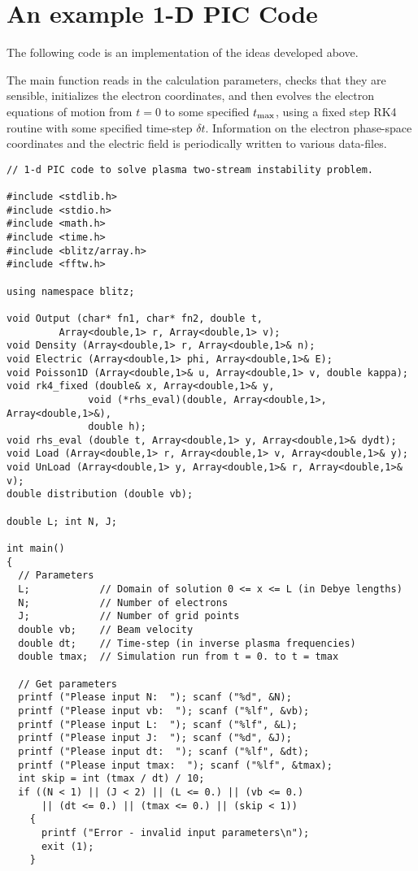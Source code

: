 \section{An example 1-D PIC Code}
The following code  is an implementation of the ideas developed above.

The main function  reads in the calculation parameters, checks that they
are sensible, initializes the electron coordinates, and then evolves the
electron equations of motion from $t=0$ to some specified $t_{\rm max}$,
using a fixed step RK4 routine with some specified time-step $\delta t$.
Information on the electron phase-space coordinates and the electric field is periodically written
to various data-files.
\begin{verbatim}
// 1-d PIC code to solve plasma two-stream instability problem.

#include <stdlib.h>
#include <stdio.h>
#include <math.h>
#include <time.h>
#include <blitz/array.h>
#include <fftw.h>

using namespace blitz;

void Output (char* fn1, char* fn2, double t, 
	     Array<double,1> r, Array<double,1> v);
void Density (Array<double,1> r, Array<double,1>& n);
void Electric (Array<double,1> phi, Array<double,1>& E);
void Poisson1D (Array<double,1>& u, Array<double,1> v, double kappa);
void rk4_fixed (double& x, Array<double,1>& y, 
              void (*rhs_eval)(double, Array<double,1>, Array<double,1>&), 
              double h);
void rhs_eval (double t, Array<double,1> y, Array<double,1>& dydt);
void Load (Array<double,1> r, Array<double,1> v, Array<double,1>& y);
void UnLoad (Array<double,1> y, Array<double,1>& r, Array<double,1>& v);
double distribution (double vb);

double L; int N, J;

int main()
{
  // Parameters
  L;            // Domain of solution 0 <= x <= L (in Debye lengths)
  N;            // Number of electrons
  J;            // Number of grid points
  double vb;    // Beam velocity
  double dt;    // Time-step (in inverse plasma frequencies)
  double tmax;  // Simulation run from t = 0. to t = tmax

  // Get parameters
  printf ("Please input N:  "); scanf ("%d", &N);
  printf ("Please input vb:  "); scanf ("%lf", &vb); 
  printf ("Please input L:  "); scanf ("%lf", &L);
  printf ("Please input J:  "); scanf ("%d", &J);
  printf ("Please input dt:  "); scanf ("%lf", &dt); 
  printf ("Please input tmax:  "); scanf ("%lf", &tmax);
  int skip = int (tmax / dt) / 10;
  if ((N < 1) || (J < 2) || (L <= 0.) || (vb <= 0.) 
      || (dt <= 0.) || (tmax <= 0.) || (skip < 1))
    {
      printf ("Error - invalid input parameters\n");
      exit (1);
    }


\end{verbatim}
